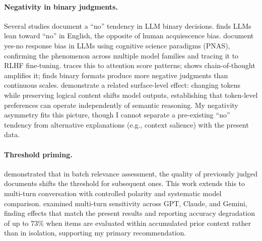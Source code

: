 \documentclass[10pt,twocolumn]{article}
\begin{document}
\paragraph{Negativity in binary judgments.}
Several studies document a ``no'' tendency in LLM binary decisions.
\citet{braun2025acquiescence} finds LLMs lean toward ``no'' in English, the opposite of human acquiescence bias.
\citet{cheung2025amplified} document yes-no response bias in LLMs using cognitive science paradigms (PNAS), confirming the phenomenon across multiple model families and tracing it to RLHF fine-tuning.
\citet{negbias2025nasa} traces this to attention score patterns; \citet{negbias2025multifacet} shows chain-of-thought amplifies it; \citet{sysbias2025binary} finds binary formats produce more negative judgments than continuous scales.
\citet{bowen2024tokenbias} demonstrate a related surface-level effect: changing tokens while preserving logical content shifts model outputs, establishing that token-level preferences can operate independently of semantic reasoning.
My negativity asymmetry fits this picture, though I cannot separate a pre-existing ``no'' tendency from alternative explanations (e.g., context salience) with the present data.

\paragraph{Threshold priming.}
\citet{thresholdpriming2024} demonstrated that in batch relevance assessment, the quality of previously judged documents shifts the threshold for subsequent ones.
This work extends this to multi-turn conversation with controlled polarity and systematic model comparison.
\citet{priorsensitivity2025} examined multi-turn sensitivity across GPT, Claude, and Gemini, finding effects that match the present results and reporting accuracy degradation of up to 73\% when items are evaluated within accumulated prior context rather than in isolation, supporting my primary recommendation.
\end{document}
